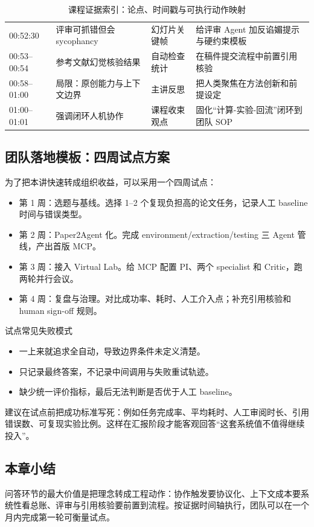 \begin{table}[H]
\begin{tabular}{p{}p{}p{}p{}}
00:52:30 & 评审可抓错但会 sycophancy & 幻灯片关键帧 & 给评审 Agent 加反谄媚提示与硬约束模板 \\
00:53--00:54 & 参考文献幻觉核验结果 & 自动检查统计 & 在稿件提交流程中前置引用核验 \\
00:58--01:00 & 局限：原创能力与上下文边界 & 主讲反思 & 把人类聚焦在方法创新和前提设定 \\
01:00--01:01 & 强调闭环人机协作 & 课程收束观点 & 固化``计算-实验-回流''闭环到团队 SOP \\
\bottomrule
\end{tabular}
\caption{课程证据索引：论点、时间戳与可执行动作映射}
\label{tab:evidence-index}
\end{table}

\subsection{团队落地模板：四周试点方案}

为了把本讲快速转成组织收益，可以采用一个四周试点：

\begin{itemize}
    \item 第 1 周：选题与基线。选择 1--2 个复现负担高的论文任务，记录人工 baseline 时间与错误类型。
    \item 第 2 周：Paper2Agent 化。完成 environment/extraction/testing 三 Agent 管线，产出首版 MCP。
    \item 第 3 周：接入 Virtual Lab。给 MCP 配置 PI、两个 specialist 和 Critic，跑两轮并行会议。
    \item 第 4 周：复盘与治理。对比成功率、耗时、人工介入点；补充引用核验和 human sign-off 规则。
\end{itemize}

\begin{warningbox}{试点常见失败模式}
\begin{itemize}
    \item 一上来就追求全自动，导致边界条件未定义清楚。
    \item 只记录最终答案，不记录中间调用与失败重试轨迹。
    \item 缺少统一评价指标，最后无法判断是否优于人工 baseline。
\end{itemize}
\end{warningbox}

建议在试点前把成功标准写死：例如任务完成率、平均耗时、人工审阅时长、引用错误数、可复现实验比例。这样在汇报阶段才能客观回答``这套系统值不值得继续投入''。

\subsection{本章小结}

问答环节的最大价值是把理念转成工程动作：协作触发要协议化、上下文成本要系统性看总账、评审与引用核验要前置到流程。按证据时间轴执行，团队可以在一个月内完成第一轮可衡量试点。

